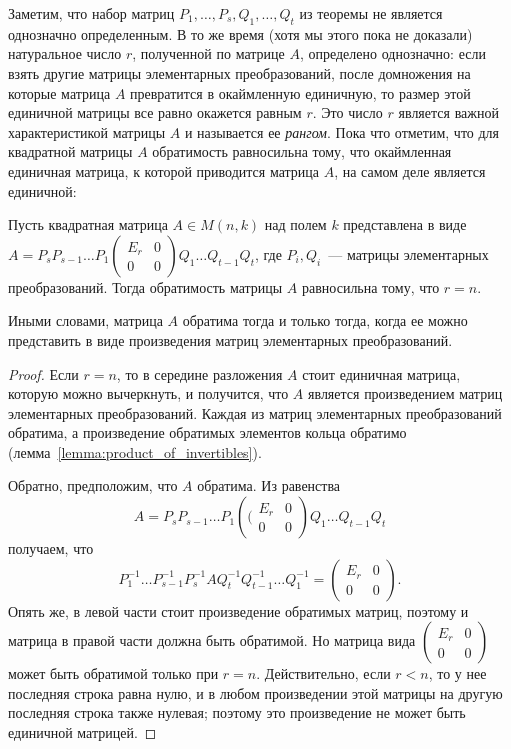 Заметим, что набор матриц $P_1,\dots,P_s,Q_1,\dots,Q_t$ из теоремы не
является однозначно определенным. В то же время (хотя мы этого пока не
доказали) натуральное число $r$, полученной по матрице $A$, определено
однозначно: если взять другие матрицы элементарных преобразований,
после домножения на которые матрица $A$ превратится в окаймленную
единичную, то размер этой единичной матрицы все равно окажется равным
$r$. Это число $r$ является важной характеристикой матрицы $A$ и
называется ее {\it рангом}. Пока что отметим, что для квадратной
матрицы $A$ обратимость равносильна тому, что окаймленная единичная
матрица, к которой приводится матрица $A$, на самом деле является
единичной:
\begin{corollary}\label{cor_invertible_pdq}
Пусть квадратная матрица $A\in M(n,k)$ над полем $k$ представлена в
виде $A=P_sP_{s-1}\dots P_1\left(\begin{matrix}
E_r & 0\\
0 & 0\end{matrix}\right)Q_1\dots Q_{t-1}Q_t$, где $P_i,Q_i$~---
матрицы элементарных преобразований. Тогда обратимость матрицы $A$
равносильна тому, что $r=n$.

Иными словами, матрица $A$ обратима тогда и только тогда, когда ее
можно представить в виде произведения матриц элементарных
преобразований.
\end{corollary}
\begin{proof}
Если $r=n$, то в середине разложения $A$ стоит единичная матрица,
которую можно вычеркнуть, и получится, что $A$ является произведением
матриц элементарных преобразований. Каждая из матриц элементарных
преобразований обратима, а произведение обратимых элементов кольца
обратимо (лемма~\ref{lemma:product_of_invertibles}).

Обратно, предположим, что $A$ обратима. Из равенства
$$A=P_sP_{s-1}\dots P_1\left((\begin{matrix}
E_r & 0\\
0 & 0\end{matrix}\right)Q_1\dots Q_{t-1}Q_t$$ получаем, что
$$P_1^{-1}\dots P_{s-1}^{-1}P_s^{-1}AQ_t^{-1}Q_{t-1}^{-1}\dots
Q_1^{-1}=\left(\begin{matrix} E_r & 0 \\ 0 &
    0\end{matrix}\right).$$ Опять же, в левой части стоит произведение
обратимых матриц, поэтому и матрица в правой части должна быть
обратимой. Но матрица вида $\left(\begin{matrix} E_r & 0 \\
0 & 0\end{matrix}\right)$ может быть обратимой только при
$r=n$. Действительно, если $r<n$, то у нее последняя строка равна
нулю, и в любом произведении этой матрицы на другую последняя строка
также нулевая; поэтому это произведение не может быть единичной
матрицей.
\end{proof}

